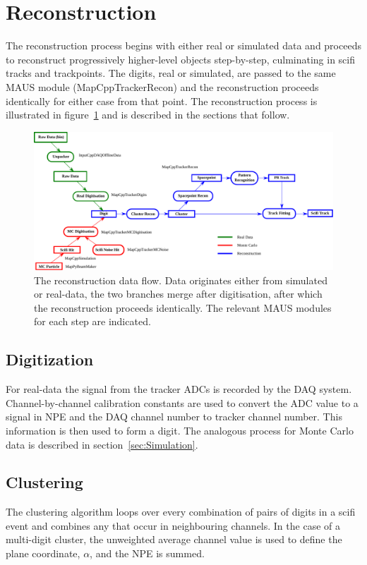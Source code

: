 \section{Reconstruction}
\label{sec:Reconstruction}
The reconstruction process begins with either real or simulated data and proceeds to reconstruct progressively higher-level objects step-by-step, culminating in scifi tracks and trackpoints. The digits, real or simulated, are passed to the same MAUS module (MapCppTrackerRecon) and the reconstruction proceeds identically for either case from that point. The reconstruction process is illustrated in figure~\ref{fig:DataFlow} and is described in the sections that follow.

\begin{figure}[tb]
  \begin{center}
    \includegraphics[width=0.95\linewidth]{07-Reconstruction/DataFlow2014.pdf}
    \caption{\label{fig:DataFlow} The reconstruction data flow. Data originates either from simulated or real-data, the two branches merge after digitisation, after which the reconstruction proceeds identically.  The relevant MAUS modules for each step are indicated.}
  \end{center}
\end{figure}

  \subsection{Digitization}
  \label{subsec:Digitization}
  For real-data the signal from the tracker ADCs is recorded by the DAQ system.  Channel-by-channel calibration constants are used to convert the ADC value to a signal in NPE and the DAQ channel number to tracker channel number.  This information is then used to form a digit.  The analogous process for Monte Carlo data is described in section~\ref{sec:Simulation}.

  \subsection{Clustering}
  \label{subsec:Clustering}
  The clustering algorithm loops over every combination of pairs of digits in a scifi event and combines any that occur in neighbouring channels. In the case of a multi-digit cluster, the unweighted average channel value is used to define the plane coordinate, $\alpha$, and the NPE is summed.

